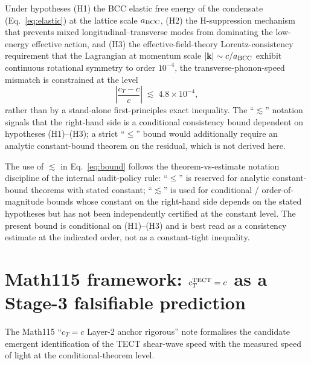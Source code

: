 \begin{theorem}
\label{thm:main}
Under hypotheses (H1) the BCC elastic free energy of the condensate
(Eq.~\eqref{eq:elastic}) at the lattice scale $a_{\rm BCC}$, (H2) the
H-suppression mechanism that prevents mixed longitudinal--transverse
modes from dominating the low-energy effective action, and (H3) the
effective-field-theory Lorentz-consistency requirement that the
Lagrangian at momentum scale $|\mathbf{k}| \sim c/a_{\rm BCC}$ exhibit
continuous rotational symmetry to order $10^{-4}$, the
transverse-phonon-speed mismatch is constrained at the level
\begin{equation}
\boxed{\left|\frac{c_T - c}{c}\right| \;\lesssim\; 4.8 \times 10^{-4}},
\label{eq:bound}
\end{equation}
rather than by a stand-alone first-principles exact inequality. The
``$\lesssim$'' notation signals that the right-hand side is a
conditional consistency bound dependent on hypotheses (H1)--(H3); a
strict ``$\le$'' bound would additionally require an analytic
constant-bound theorem on the residual, which is not derived here.
\end{theorem}

\begin{remark}
\label{rem:notation}
The use of $\lesssim$ in Eq.~\eqref{eq:bound} follows the
theorem-vs-estimate notation discipline of the internal audit-policy rule:
``$\le$'' is reserved for analytic constant-bound theorems with stated
constant; ``$\lesssim$'' is used for conditional / order-of-magnitude
bounds whose constant on the right-hand side depends on the stated
hypotheses but has not been independently certified at the constant
level. The present bound is conditional on (H1)--(H3) and is best
read as a consistency estimate at the indicated order, not as a
constant-tight inequality.
\end{remark}

\section{Math115 framework: $c_T^{\rm TECT} = c$ as a Stage-3
falsifiable prediction}\label{sec:Math115}

The Math115 ``$c_T = c$ Layer-2 anchor rigorous'' note formalises
the candidate emergent identification of the TECT shear-wave speed
with the measured speed of light at the conditional-theorem level.

